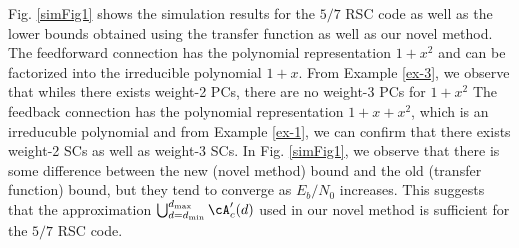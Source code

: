 Fig. \ref{simFig1} shows the simulation results for the $5/7$ RSC code as well as the lower bounds obtained using the transfer function as well as our novel method. The feedforward connection has the polynomial representation $1+x^2$ and can be factorized into the irreducible polynomial $1+x$. From Example \ref{ex-3}, we observe that whiles there exists weight-2 PCs, there  are no weight-3 PCs for $1+x^2$
The feedback connection has the polynomial representation $1+x+x^2$, which is an irreducuble polynomial and from Example \ref{ex-1}, we can confirm that there exists weight-2 SCs as well as weight-3 SCs. In Fig. \ref{simFig1}, we observe that there is some difference between the new (novel method) bound and the old (transfer function) bound, but they tend to converge as $E_b/N_0$ increases. This suggests that the approximation $ \bigcup_{d = d_{\text{min}}}^{d_{\text{max}}} \cA'_c(d) $ used in our novel method is sufficient for the $5/7$ RSC code.





